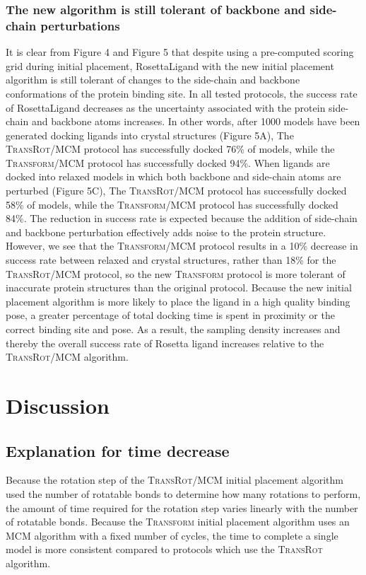 \subsubsection{The new algorithm is still tolerant of backbone and side-chain perturbations}
It is clear from Figure 4 and Figure 5 that despite using a pre-computed scoring grid during initial placement, RosettaLigand with the new initial placement algorithm is still tolerant of changes to the side-chain and backbone conformations of the protein binding site. In all tested protocols, the success rate of RosettaLigand decreases as the uncertainty associated with the protein side-chain and backbone atoms increases.
In other words, after 1000 models have been generated docking ligands into crystal structures (Figure 5A), The \textsc{TransRot}/MCM protocol has successfully docked 76\% of models, while the \textsc{Transform}/MCM protocol has successfully docked 94\%.
When ligands are docked into relaxed models in which both backbone and side-chain atoms are perturbed (Figure 5C), The \textsc{TransRot}/MCM protocol has successfully docked 58\% of models, while the \textsc{Transform}/MCM protocol has successfully docked 84\%.
The reduction in success rate is expected because the addition of side-chain and backbone perturbation effectively adds noise to the protein structure.
However, we see that the \textsc{Transform}/MCM protocol results in a 10\% decrease in success rate between relaxed and crystal structures, rather than 18\% for the \textsc{TransRot}/MCM protocol, so the new \textsc{Transform} protocol is more tolerant of inaccurate protein structures than the original protocol.
Because the new initial placement algorithm is more likely to place the ligand in a high quality binding pose, a greater percentage of total docking time is spent in proximity or the correct binding site and pose.
As a result, the sampling density increases and thereby the overall success rate of Rosetta ligand increases relative to the \textsc{TransRot}/MCM algorithm.

\section{Discussion}

\subsection{Explanation for time decrease}
Because the rotation step of the \textsc{TransRot}/MCM initial placement algorithm used the number of rotatable bonds to determine how many rotations to perform, the amount of time required for the rotation step varies linearly with the number of rotatable bonds.
Because the \textsc{Transform} initial placement algorithm uses an MCM algorithm with a fixed number of cycles, the time to complete a single model is more consistent compared to protocols which use the \textsc{TransRot} algorithm.  

